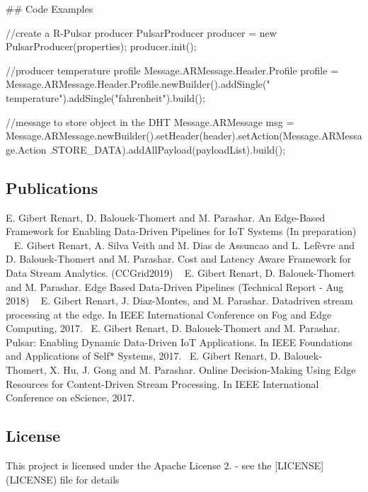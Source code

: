 \#\# Code Examples 
\begin{DoxyCode}
\textcolor{comment}{//create a R-Pulsar producer}
PulsarProducer producer = \textcolor{keyword}{new} PulsarProducer(properties);
producer.init();

\textcolor{comment}{//producer temperature profile}
Message.ARMessage.Header.Profile profile = Message.ARMessage.Header.Profile.newBuilder().addSingle(\textcolor{stringliteral}{"
      temperature"}).addSingle(\textcolor{stringliteral}{"fahrenheit"}).build();

\textcolor{comment}{//message to store object in the DHT}
Message.ARMessage msg = Message.ARMessage.newBuilder().setHeader(header).setAction(Message.ARMessage.Action
      .STORE\_DATA).addAllPayload(payloadList).build();
\end{DoxyCode}


\subsection*{Publications}

E. Gibert Renart, D. Balouek-\/\+Thomert and M. Parashar. An Edge-\/\+Based Framework for Enabling Data-\/\+Driven Pipelines for IoT Systems (In preparation) ~\newline
 E. Gibert Renart, A. Silva Veith and M. Dias de Assuncao and L. Lefèvre and D. Balouek-\/\+Thomert and M. Parashar. Cost and Latency Aware Framework for Data Stream Analytics. (C\+C\+Grid2019) ~\newline
 E. Gibert Renart, D. Balouek-\/\+Thomert and M. Parashar. Edge Based Data-\/\+Driven Pipelines (Technical Report -\/ Aug 2018) ~\newline
 E. Gibert Renart, J. Diaz-\/\+Montes, and M. Parashar. Datadriven stream processing at the edge. In I\+E\+EE International Conference on Fog and Edge Computing, 2017.~\newline
 E. Gibert Renart, D. Balouek-\/\+Thomert and M. Parashar. Pulsar\+: Enabling Dynamic Data-\/\+Driven IoT Applications. In I\+E\+EE Foundations and Applications of Self$\ast$ Systems, 2017.~\newline
 E. Gibert Renart, D. Balouek-\/\+Thomert, X. Hu, J. Gong and M. Parashar. Online Decision-\/\+Making Using Edge Resources for Content-\/\+Driven Stream Processing. In I\+E\+EE International Conference on e\+Science, 2017.~\newline


\subsection*{License}

This project is licensed under the Apache License 2. -\/ see the \mbox{[}L\+I\+C\+E\+N\+SE\mbox{]}(L\+I\+C\+E\+N\+SE) file for details 